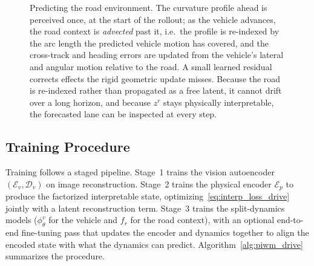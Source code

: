 \documentclass[preprint,12pt]{elsarticle}
\newcommand{\zr}{z^{r}}      %
\begin{document}
\begin{figure}[t]
{}
    \caption{Predicting the road environment. The curvature profile ahead is
    perceived once, at the start of the rollout; as the vehicle advances, the
    road context is \emph{advected} past it, i.e.\ the profile is re-indexed by
    the arc length the predicted vehicle motion has covered, and the cross-track
    and heading errors are updated from the vehicle's lateral and angular motion
    relative to the road. A small learned residual corrects effects the rigid
    geometric update misses. Because the road is re-indexed rather than
    propagated as a free latent, it cannot drift over a long horizon, and because
    $\zr$ stays physically interpretable, the forecasted lane can be inspected at
    every step.}
    \label{fig:prediction}
\end{figure}

\subsection{Training Procedure}

Training follows a staged pipeline.
Stage~1 trains the vision autoencoder $(\mathcal{E}_v, \mathcal{D}_v)$ on image
reconstruction.
Stage~2 trains the physical encoder $\mathcal{E}_p$ to produce the factorized
interpretable state, optimizing~\eqref{eq:interp_loss_drive} jointly with a latent
reconstruction term.
Stage~3 trains the split-dynamics models ($\phi^{v}_\theta$ for the vehicle and $f_r$
for the road context), with an optional end-to-end fine-tuning pass that updates
the encoder and dynamics together to align the encoded state with what the
dynamics can predict.
Algorithm~\ref{alg:piwm_drive} summarizes the procedure.
\end{document}
